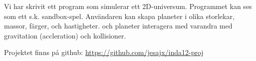 Vi har skrivit ett program som simulerar ett 2D-universum.
Programmet kan ses som ett s.k. sandbox-spel.
Användaren kan skapa planeter i olika
storlekar, massor, färger, och hastigheter.
och planeter interagera med varandra med gravitation (accleration)
och kollisioner.

Projektet finns på github:
\url{https://github.com/jesajx/inda12-proj}
